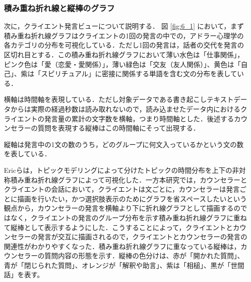 \documentclass[shuuron]{kuee}
\begin{document}


\subsubsection{積み重ね折れ線と縦棒のグラフ}
次に，クライエント発言ビューについて説明する．
図
\ref{fig:6_1}
において，まず積み重ね折れ線グラフはクライエントの1回の発言の中での，アドラー心理学の各カテゴリの分布を可視化している．ただし1回の発言は，話者の交代を発言の区切れ目とする．この積み重ね折れ線グラフにおいて薄い水色は「仕事関係」，ピンク色は「愛（恋愛・愛関係）」，薄い緑色は「交友（友人関係）」、黄色は「自己」、紫は「スピリチュアル」に密接に関係する単語を含む文の分布を表している．

横軸は時間軸を表現している．ただし対象データである書き起こしテキストデータからは実際の経過秒数は読み取れないので，読み込ませたデータ内におけるクライエントの発言量の累計の文字数を横軸，つまり時間軸とした．後述するカウンセラーの質問を表現する縦棒はこの時間軸にそって出現する．

縦軸は発言中の1文の数のうち，どのグループに何文入っているかという文の数を表している．



Ericら\cite{taskdriven}は，トピックモデリングによって分けたトピックの時間分布を上下の非対称積み重ね折れ線グラフによって可視化した．一方本研究では，カウンセラーとクライエントの会話において，クライエントは文ごとに，カウンセラーは発言ごとに描画を行いたい，かつ選択肢表示のためにグラフを省スペースしたいという観点から，カウンセラーの発言を横軸より下に折れ線グラフとして描画するのではなく，クライエントの発言のグループ分布を示す積み重ね折れ線グラフに重ねて縦棒として表示するようにした．こうすることによって，クライエントとカウンセラーの発言が交互に描画されるので，クライエントとカウンセラーの発言の関連性がわかりやすくなった．積み重ね折れ線グラフに重なっている縦棒は，カウンセラーの質問内容の形態を示す．縦棒の色分けは、赤が「開かれた質問」、青が「閉じられた質問」、オレンジが「解釈や助言」、紫は「相槌」、黒が「世間話」を表す。
\end{document}
